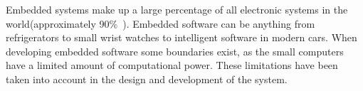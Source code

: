 Embedded systems make up a large percentage of all electronic systems in the world(approximately 90\%~\citep{embedded_software_number}). Embedded software can be anything from refrigerators to small wrist watches to intelligent software in modern cars. When developing embedded software some boundaries exist, as the small computers have a limited amount of computational power. These limitations have been taken into account in the design and development of the \projname{} system. 



